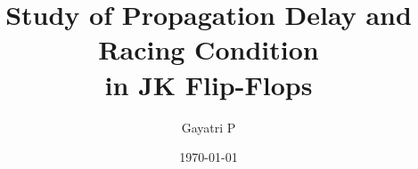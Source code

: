 \documentclass[reprint,amsmath,amssymb,aps]{revtex4-2}
\begin{document}
    \title{Study of Propagation Delay and Racing Condition\\in JK Flip-Flops}

    \author{Gayatri P}
    \date{\today}

    \maketitle

    
    
    
    

\end{document}
